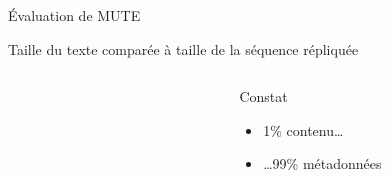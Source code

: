 \begin{frame}{Évaluation de MUTE}
    \begin{block}{Taille du texte comparée à taille de la séquence répliquée}
        \begin{columns}
            \begin{column}{0.6\textwidth}
                \begin{figure}
                \end{figure}
            \end{column}
            \begin{column}{0.4\textwidth}
                \pause
                \begin{block}{Constat}
                    \begin{itemize}
                        \item 1\% contenu\dots
                        \item \dots 99\% métadonnées
                    \end{itemize}
                \end{block}
                \pause
                \begin{center}

\end{center}
\end{column}
\end{columns}
\end{block}
\end{frame}
